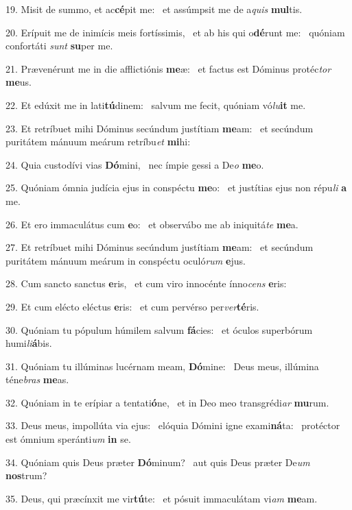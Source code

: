 19. Misit de summo, et ac\textbf{cé}pit me: \ast\  et assúmpsit me de a\textit{quis} \textbf{mul}tis.\

20. Erípuit me de inimícis meis fortíssimis, \dag\  et ab his qui o\textbf{dé}runt me: \ast\  quóniam confortáti \textit{sunt} \textbf{su}per me.\

21. Prævenérunt me in die afflictiónis \textbf{me}æ: \ast\  et factus est Dóminus protéc\textit{tor} \textbf{me}us.\

22. Et edúxit me in lati\textbf{tú}dinem: \ast\  salvum me fecit, quóniam vó\textit{lu}\textbf{it} me.\

23. Et retríbuet mihi Dóminus secúndum justítiam \textbf{me}am: \ast\  et secúndum puritátem mánuum meárum retríbu\textit{et} \textbf{mi}hi:\

24. Quia custodívi vias \textbf{Dó}mini, \ast\  nec ímpie gessi a De\textit{o} \textbf{me}o.\

25. Quóniam ómnia judícia ejus in conspéctu \textbf{me}o: \ast\  et justítias ejus non répu\textit{li} \textbf{a} me.\

26. Et ero immaculátus cum \textbf{e}o: \ast\  et observábo me ab iniquitá\textit{te} \textbf{me}a.\

27. Et retríbuet mihi Dóminus secúndum justítiam \textbf{me}am: \ast\  et secúndum puritátem mánuum meárum in conspéctu oculó\textit{rum} \textbf{e}jus.\

28. Cum sancto sanctus \textbf{e}ris, \ast\  et cum viro innocénte ínno\textit{cens} \textbf{e}ris:\

29. Et cum elécto eléctus \textbf{e}ris: \ast\  et cum pervérso per\textit{ver}\textbf{té}ris.\

30. Quóniam tu pópulum húmilem salvum \textbf{fá}cies: \ast\  et óculos superbórum humi\textit{li}\textbf{á}bis.\

31. Quóniam tu illúminas lucérnam meam, \textbf{Dó}mine: \ast\  Deus meus, illúmina téne\textit{bras} \textbf{me}as.\

32. Quóniam in te erípiar a tentati\textbf{ó}ne, \ast\  et in Deo meo transgrédi\textit{ar} \textbf{mu}rum.\

33. Deus meus, impollúta via ejus: \dag\  elóquia Dómini igne exami\textbf{ná}ta: \ast\  protéctor est ómnium speránti\textit{um} \textbf{in} se.\

34. Quóniam quis Deus præter \textbf{Dó}minum? \ast\  aut quis Deus præter De\textit{um} \textbf{nos}trum?\

35. Deus, qui præcínxit me vir\textbf{tú}te: \ast\  et pósuit immaculátam vi\textit{am} \textbf{me}am.\

